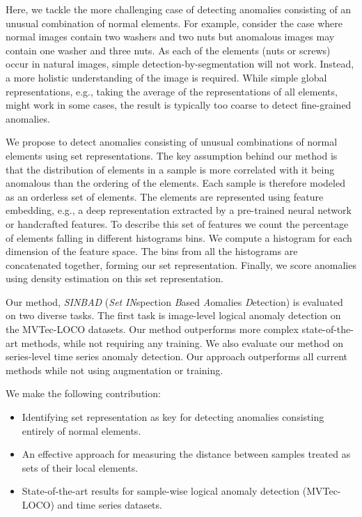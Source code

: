 \documentclass{article}
\begin{document}
Here, we tackle the more challenging case of detecting anomalies consisting of an unusual combination of normal elements. For example, consider the case where normal images contain two washers and two nuts but anomalous images may contain one washer and three nuts. As each of the elements (nuts or screws) occur in natural images, simple detection-by-segmentation will not work. Instead, a more holistic understanding of the image is required. While simple global representations, e.g., taking the average of the representations of all elements, might work in some cases, the result is typically too coarse to detect fine-grained anomalies.  

We propose to detect anomalies consisting of unusual combinations of normal elements using set representations. The key assumption behind our method is that the distribution of elements in a sample is more correlated with it being anomalous than the ordering of the elements. Each sample is therefore modeled as an orderless set of elements. The elements are represented using feature embedding, e.g., a deep representation extracted by a pre-trained neural network or handcrafted features. To describe this set of features we count the percentage of elements falling in different histograms bins. We compute a histogram for each dimension of the feature space. The bins from all the histograms are concatenated together, forming our set representation. Finally, we score anomalies using density estimation on this set representation. 




Our method, \textit{SINBAD} (\textit{Set} \textit{IN}spection
\textit{B}ased \textit{A}omalies \textit{D}etection) is evaluated on two diverse tasks. The first task is image-level logical anomaly detection on the MVTec-LOCO datasets. Our method outperforms more complex state-of-the-art methods, while not requiring any training. We also evaluate our method on series-level time series anomaly detection. Our approach outperforms all current methods while not using augmentation or training. 







We make the following contribution:

\begin{itemize}
\item Identifying set representation as key for detecting anomalies consisting entirely of normal elements.
\item An effective approach for measuring the distance between samples treated as sets of their local elements.
\item State-of-the-art results for sample-wise logical anomaly detection (MVTec-LOCO) and time series datasets.
\end{itemize}
\end{document}
